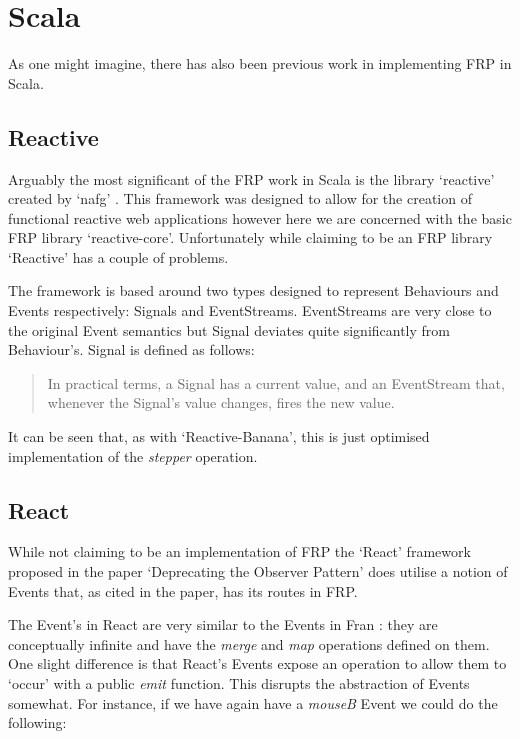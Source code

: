   \section{Scala}
    As one might imagine, there has also been previous work in implementing FRP in Scala. 

    \subsection{Reactive}
      Arguably the most significant of the FRP work in Scala is the library `reactive' created by `nafg' \cite{Nafg}. This    
      framework was designed to allow for the creation of functional reactive web applications however here we are concerned 
      with the basic FRP library `reactive-core'. Unfortunately while claiming to be an FRP library `Reactive'
      has a couple of problems.

      The framework is based around two types designed to represent Behaviours and Events respectively: Signals
      and EventStreams. EventStreams are very close to the original Event semantics but Signal deviates quite significantly 
      from Behaviour's. Signal is defined as follows:

      \begin{quote}
        In practical terms, a Signal has a current value, and an EventStream that, whenever the Signal's value changes,     
        fires the new value.
      \end{quote}  
      
      It can be seen that, as with `Reactive-Banana', this is just optimised implementation of the \emph{stepper}
      operation.

    \subsection{React}
      While not claiming to be an implementation of FRP the `React' framework proposed in the 
      paper `Deprecating the Observer Pattern' \cite{Maier2010} does utilise a notion of Events that, as cited in the paper,
      has its routes in FRP.

      The Event's in React are very similar to the Events in Fran \cite{Elliott1997}: they are conceptually infinite
      and have the \emph{merge} and \emph{map} operations defined on them. One slight difference is that React's
      Events expose an operation to allow them to `occur' with a public \emph{emit} function. This disrupts
      the abstraction of Events somewhat. For instance, if we have again have a \emph{mouseB} Event we could do the following:

